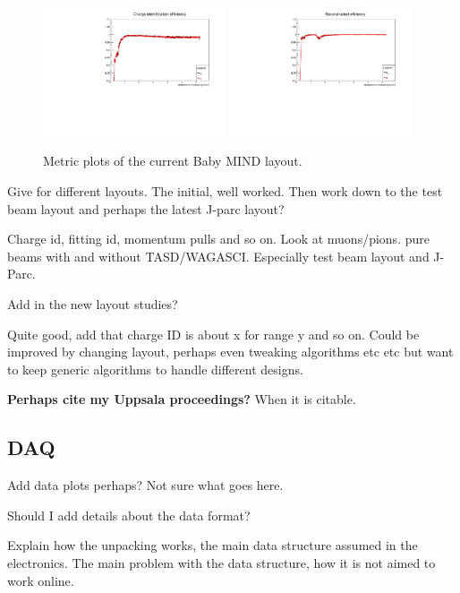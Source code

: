 \begin{figure}[h!]
\centering
\includegraphics[width=0.48\textwidth]{figures/oldStudies/FullChargeID.pdf}
\includegraphics[width=0.48\textwidth]{figures/oldStudies/FullFitted.pdf}
\caption{Metric plots of the current Baby MIND layout.}
\label{fig:TestBeamMIND2}
\end{figure}

Give for different layouts. The initial, well worked. Then work down to the test beam layout and perhaps the latest J-parc layout? 

Charge id, fitting id, momentum pulls and so on.
Look at muons/pions. pure beams with and without TASD/WAGASCI. Especially test beam layout and J-Parc.

Add in the new layout studies?

Quite good, add that charge ID is about x for range y and so on.  Could be improved by changing layout, perhaps even tweaking algorithms etc etc but want to keep generic algorithms to handle different designs.

\textbf{Perhaps cite my Uppsala proceedings?} When it is citable.

\subsection{DAQ}
Add data plots perhaps? Not sure what goes here.

Should I add details about the data format?

Explain how the unpacking works, the main data structure assumed in the electronics. The main problem with the data structure, how it is not aimed to work online. 

